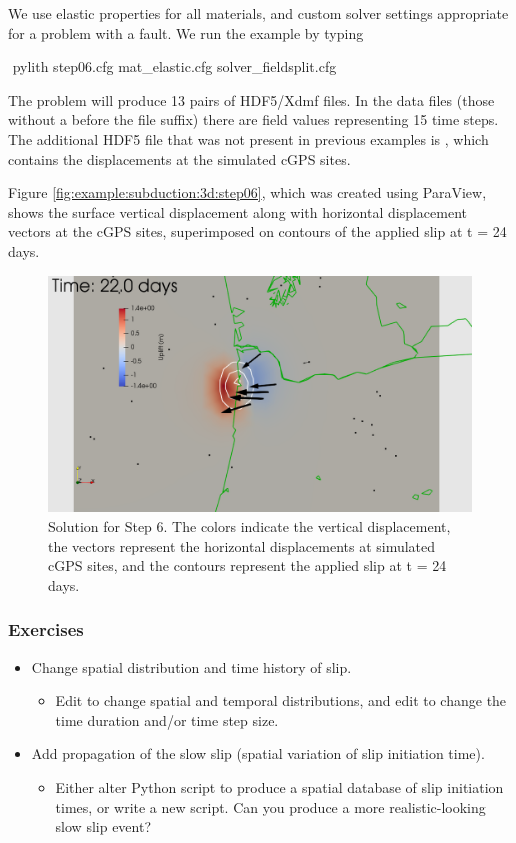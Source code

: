 We use elastic properties for all materials, and custom solver
settings appropriate for a problem with a fault. We run the example by typing
\begin{shell}
$$ pylith step06.cfg mat_elastic.cfg solver_fieldsplit.cfg
\end{shell}
The problem will produce 13 pairs of HDF5/Xdmf files. In the data
files (those without a  before the file suffix) there
are field values representing 15 time steps. The additional HDF5 file
that was not present in previous examples is
, which contains the displacements at
the simulated cGPS sites.

Figure \vref{fig:example:subduction:3d:step06}, which was created
using ParaView, shows the surface vertical displacement along with
horizontal displacement vectors at the cGPS sites, superimposed on
contours of the applied slip at t = 24 days.

\begin{figure}
  \includegraphics[width=4.5in]{examples/figs/subduction3d_step06_soln}
  \caption{Solution for Step 6. The colors indicate the vertical
    displacement, the vectors represent the horizontal displacements
    at simulated cGPS sites, and the contours represent the applied
    slip at t = 24 days.}
  \label{fig:example:subduction:3d:step06}
\end{figure}


\subsubsection{Exercises}

\begin{itemize}
\item Change spatial distribution and time history of slip.
  \begin{itemize}
  \item Edit  to change spatial and
    temporal distributions, and edit  to change the
    time duration and/or time step size.
  \end{itemize}
\item Add propagation of the slow slip (spatial variation of slip
  initiation time).
  \begin{itemize}
  \item Either alter Python script to produce a spatial database of
    slip initiation times, or write a new script. Can you produce a
    more realistic-looking slow slip event?
  \end{itemize}
\end{itemize}

